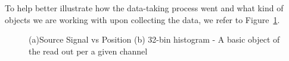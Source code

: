 To help better illustrate how the data-taking process went and what kind of objects we are working with upon collecting the data, we refer to Figure~\ref{fig:hf_campaigns_histograms}.

\begin{figure}[!h]
    \begin{center}
        \caption
        {(a)Source Signal vs Position (b) 32-bin histogram - A basic object of the read out per a given channel}
        \label{fig:hf_campaigns_histograms}
    \end{center}
\end{figure}


